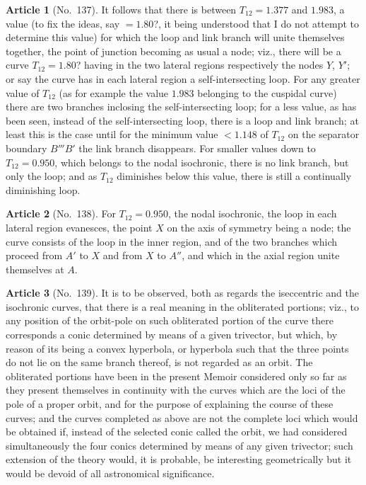 \documentclass[11pt,a4paper]{article}
\theoremstyle{definition}
\newtheorem{art}{Article}
\begin{document}
\begin{art}[No.~137]
It follows that there is between $T_{12} = 1.377$ and $1.983$, a value (to fix the ideas, say $= 1.80$?, it being understood that I do not attempt to determine this value) for which the loop and link branch will unite themselves together, the point of junction becoming as usual a node; viz., there will be a curve $T_{12} = 1.80$? having in the two lateral regions respectively the nodes $Y$, $Y'$; or say the curve has in each lateral region a self-intersecting loop. For any greater value of $T_{12}$ (as for example the value $1.983$ belonging to the cuspidal curve) there are two branches inclosing the self-intersecting loop; for a less value, as has been seen, instead of the self-intersecting loop, there is a loop and link branch; at least this is the case until for the minimum value $< 1.148$ of $T_{12}$ on the separator boundary $B'''B'$ the link branch disappears. For smaller values down to $T_{12} = 0.950$, which belongs to the nodal isochronic, there is no link branch, but only the loop; and as $T_{12}$ diminishes below this value, there is still a continually diminishing loop.
\end{art}

\begin{art}[No.~138]
For $T_{12} = 0.950$, the nodal isochronic, the loop in each lateral region evanesces, the point $X$ on the axis of symmetry being a node; the curve consists of the loop in the inner region, and of the two branches which proceed from $A'$ to $X$ and from $X$ to $A''$, and which in the axial region unite themselves at $A$.
\end{art}

\begin{art}[No.~139]
It is to be observed, both as regards the iseccentric and the isochronic curves, that there is a real meaning in the obliterated portions; viz., to any position of the orbit-pole on such obliterated portion of the curve there corresponds a conic determined by means of a given trivector, but which, by reason of its being a convex hyperbola, or hyperbola such that the three points do not lie on the same branch thereof, is not regarded as an orbit. The obliterated portions have been in the present Memoir considered only so far as they present themselves in continuity with the curves which are the loci of the pole of a proper orbit, and for the purpose of explaining the course of these curves; and the curves completed as above are not the complete loci which would be obtained if, instead of the selected conic called the orbit, we had considered simultaneously the four conics determined by means of any given trivector; such extension of the theory would, it is probable, be interesting geometrically but it would be devoid of all astronomical significance.
\end{art}
\end{document}

